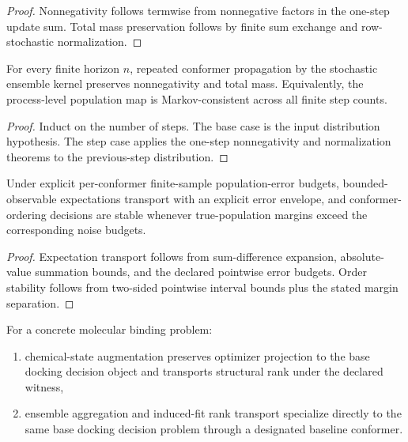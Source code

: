 \begin{proof}
Nonnegativity follows termwise from nonnegative factors in the one-step update sum. Total mass preservation follows by finite sum exchange and row-stochastic normalization.
\end{proof}

\begin{theorem}\label{thm:ensemble-multistep-population-transport}
For every finite horizon $n$, repeated conformer propagation by the stochastic ensemble kernel preserves nonnegativity and total mass. Equivalently, the process-level population map is Markov-consistent across all finite step counts.
\end{theorem}

\begin{proof}
Induct on the number of steps. The base case is the input distribution hypothesis. The step case applies the one-step nonnegativity and normalization theorems to the previous-step distribution.
\end{proof}

\begin{theorem}\label{thm:ensemble-statistical-validity-transport}
Under explicit per-conformer finite-sample population-error budgets, bounded-observable expectations transport with an explicit error envelope, and conformer-ordering decisions are stable whenever true-population margins exceed the corresponding noise budgets.
\end{theorem}

\begin{proof}
Expectation transport follows from sum-difference expansion, absolute-value summation bounds, and the declared pointwise error budgets. Order stability follows from two-sided pointwise interval bounds plus the stated margin separation.
\end{proof}

\begin{theorem}\label{thm:chemical-ensemble-transport-binding-specialization}
For a concrete molecular binding problem:
\begin{enumerate}
\item chemical-state augmentation preserves optimizer projection to the base docking decision object and transports structural rank under the declared witness,
\item ensemble aggregation and induced-fit rank transport specialize directly to the same base docking decision problem through a designated baseline conformer.
\end{enumerate}
\end{theorem}


